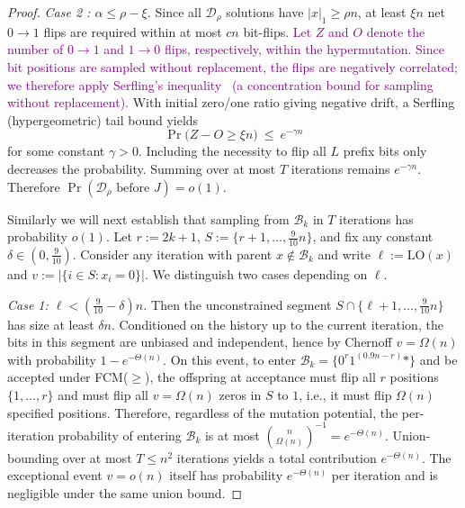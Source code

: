 \documentclass[lettersize,journal]{IEEEtran}
\newcommand{\rerev}[1]{\textcolor{purple}{#1}}
\begin{document}
\begin{proof}
	\emph{Case 2 : $\alpha\le \rho-\xi$.}
	Since all $\mathcal{D}_\rho$ solutions have $|x|_1\ge \rho n$, at least $\xi n$ net $0\!\to\!1$ flips are required within at most
	$cn$ bit-flips. \rerev{Let $Z$ and $O$ denote the number of $0\!\to\!1$ and $1\!\to\!0$ flips, respectively, within the hypermutation. Since bit positions are sampled without replacement, the flips are negatively correlated; we therefore apply Serfling's inequality~\cite{serfling1974probability} (a concentration bound for sampling without replacement).} With initial zero/one ratio giving negative drift,
	a Serfling (hypergeometric) tail bound yields
	\[
	\Pr\bigl(Z-O\ge \xi n\bigr)\ \le\ e^{-\gamma n}
	\]
	for some constant $\gamma>0$. Including the necessity to flip all $L$ prefix bits only decreases the probability.
	Summing over at most $T$ iterations remains $e^{-\gamma n}$. Therefore $\Pr(\text{$\mathcal{D}_\rho$ before }J)=o(1)$.
	
	Similarly we will next establish that sampling from $\mathcal{B}_k$ in $T$ iterations  has probability $o(1)$.	Let $r:=2k{+}1$, $S:=\{r{+}1,\dots,\tfrac{9}{10}n\}$, and fix any constant
	$\delta\in(0,\tfrac{9}{10})$.  Consider any iteration with parent
	$x\notin\mathcal{B}_k$ and write $\ell:=\mathrm{LO}(x)$ and
	$v:=|\{i\in S:x_i=0\}|$.  We distinguish two cases depending on $\ell$.
	
	\emph{Case 1: $\ell < (\tfrac{9}{10}-\delta)n$.}
	Then the unconstrained segment
	$S\cap\{\ell{+}1,\dots,\tfrac{9}{10}n\}$ has size at least $\delta n$.
	Conditioned on the history up to the current iteration, the bits in this segment
	are unbiased and independent, hence by Chernoff $v=\Omega(n)$ with probability
	$1-e^{-\Theta(n)}$.  On this event, to enter
	$\mathcal{B}_k=\{0^{r}1^{(0.9n-r)}*\}$ and be accepted under FCM($\ge$), the
	offspring at acceptance must flip all $r$ positions $\{1,\dots,r\}$ and must flip
	all $v=\Omega(n)$ zeros in $S$ to $1$, i.e., it must flip $\Omega(n)$ specified
	positions.  Therefore, regardless of the mutation potential, the per-iteration
	probability of entering $\mathcal{B}_k$ is at most
	$\binom{n}{\Omega(n)}^{-1}=e^{-\Theta(n)}$.  Union-bounding over at most
	$T\le n^2$ iterations yields a total contribution $e^{-\Theta(n)}$.
	The exceptional event $v=o(n)$ itself has probability $e^{-\Theta(n)}$ per
	iteration and is negligible under the same union bound.
	

\end{proof}
\end{document}
